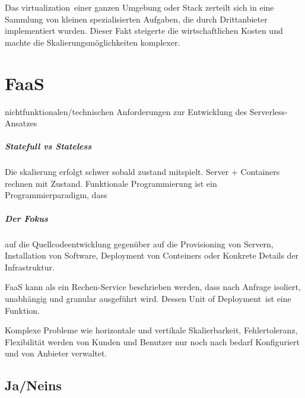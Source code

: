 \documentclass[
12pt,
english,
ngerman,
headsepline,
twoside,
openright,
numbers=noenddot,version=first
]{scrreprt}
\begin{document}

Das \glqq\Gls{virtualization}\grqq\ einer ganzen Umgebung oder Stack zerteilt sich in eine Sammlung von kleinen spezialisierten Aufgaben, die durch Drittanbieter implementiert wurden. Dieser Fakt steigerte die wirtschaftlichen Kosten und machte die Skalierungsmöglichkeiten komplexer\cite{patternAWS}.


\chapter{FaaS}{nichtfunktionalen/technischen Anforderungen zur Entwicklung des Serverless-Ansatzes}

\paragraph{Statefull vs Stateless} 
Die skalierung erfolgt schwer sobald zustand mitspielt. Server + Containers rechnen mit Zustand. 
Funktionale Programmierung ist ein Programmierparadigm, dass 

\paragraph{Der Fokus} auf die Quellcodeentwicklung gegenüber auf die Provisioning von Servern, Installation von Software, Deployment von Conteiners oder Konkrete Details der Infrastruktur.



\label{sec:faas}
\acrshort{FaaS} kann als ein Rechen-Service beschrieben werden, dass nach Anfrage isoliert, unabhängig und granular ausgeführt wird. Dessen \glqq Unit of Deployment\grqq\ ist eine Funktion. 

Komplexe Probleme wie horizontale und vertikale Skalierbarkeit, Fehlertoleranz, Flexibilität werden von Kunden und Benutzer nur noch nach bedarf Konfiguriert und von Anbieter verwaltet.


\section{Ja/Neins}
\end{document}
